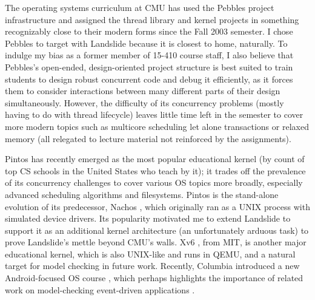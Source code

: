 The operating systems curriculum at CMU has used the Pebbles project infrastructure
and assigned the thread library \cite{thrlib} and kernel \cite{kspec} projects
in something recognizably close to their modern forms since the Fall 2003 semester.
I chose Pebbles to target with Landslide because it is closest to home, naturally.
To indulge my bias as a former member of 15-410 course staff,
I also believe that Pebbles's open-ended, design-oriented project structure is best suited
to train students to design robust concurrent code and debug it efficiently,
as it forces them to consider interactions between many different parts of their design simultaneously.
However, the difficulty of its concurrency problems (mostly having to do with thread lifecycle)
leaves little time left in the semester to cover more modern topics
such as multicore scheduling let alone transactions or relaxed memory
(all relegated to lecture material not reinforced by the assignments).

Pintos \cite{pintos} has recently emerged as the most popular educational kernel
(by count of top CS schools in the United States who teach by it);
it trades off the prevalence of its concurrency challenges to cover various OS topics more broadly,
especially advanced scheduling algorithms and filesystems.
Pintos is the stand-alone evolution of its predecessor, Nachos \cite{nachos},
which originally ran as a UNIX process with simulated device drivers.
Its popularity motivated me to extend Landslide to support it as an additional kernel architecture
(an unfortunately arduous task)
to prove Landslide's mettle beyond CMU's walls.
Xv6 \cite{xv6}, from MIT, is another major educational kernel, which is also UNIX-like and runs in QEMU,
and a natural target for model checking in future work.
Recently, Columbia introduced a new Android-focused OS course \cite{teaching-android},
which perhaps highlights the importance of related work on model-checking event-driven applications \cite{r4}.

